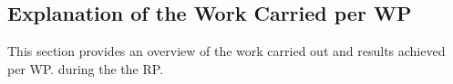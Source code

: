 \subsection{Explanation of the Work Carried per WP}

This section provides an overview of the work carried out and results achieved per WP. 
during the the  \acrshort{RP}.   







% 










